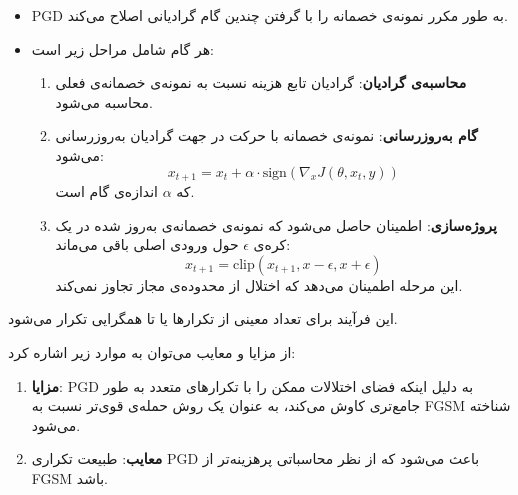 \begin{qsolve}
\begin{itemize}
	\begin{itemize}
		\item PGD به طور مکرر نمونه‌ی خصمانه را با گرفتن چندین گام گرادیانی اصلاح می‌کند.
		\item هر گام شامل مراحل زیر است:
		\begin{enumerate}
			\item \textbf{محاسبه‌ی گرادیان}: گرادیان تابع هزینه نسبت به نمونه‌ی خصمانه‌ی فعلی محاسبه می‌شود.
			\item \textbf{گام به‌روزرسانی}: نمونه‌ی خصمانه با حرکت در جهت گرادیان به‌روزرسانی می‌شود:
			\[
			x_{t+1} = x_t + \alpha \cdot \text{sign}(\nabla_x J(\theta, x_t, y))
			\]
			که \(\alpha\) اندازه‌ی گام است.
			\item \textbf{پروژه‌سازی}: اطمینان حاصل می‌شود که نمونه‌ی خصمانه‌ی به‌روز شده در یک کره‌ی \(\epsilon\) حول ورودی اصلی باقی می‌ماند:
			\[
			x_{t+1} = \text{clip}(x_{t+1}, x - \epsilon, x + \epsilon)
			\]
			این مرحله اطمینان می‌دهد که اختلال از محدوده‌ی مجاز تجاوز نمی‌کند.
		\end{enumerate}
	\end{itemize}
	\end{itemize}
\end{qsolve}



\begin{qsolve}
	این فرآیند برای تعداد معینی از تکرارها یا تا همگرایی تکرار می‌شود.
	
	
	از مزایا و معایب  می‌توان به موارد زیر اشاره کرد:
	
	\begin{enumerate}
		\item \textbf{مزایا}: PGD به دلیل اینکه فضای اختلالات ممکن را با تکرارهای متعدد به طور جامع‌تری کاوش می‌کند، به عنوان یک روش حمله‌ی قوی‌تر نسبت به FGSM شناخته می‌شود.
		
		
		\item \textbf{معایب}: طبیعت تکراری PGD باعث می‌شود که از نظر محاسباتی پرهزینه‌تر از FGSM باشد.
	\end{enumerate}
\end{qsolve}



